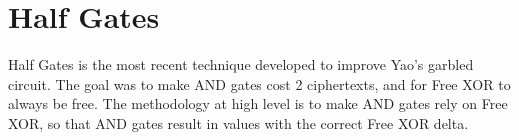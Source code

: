 \documentclass[12pt,twoside]{reedthesis}
\begin{document}

\section{Half Gates}
Half Gates is the most recent technique developed to improve Yao's garbled circuit.
The goal was to make AND gates cost 2 ciphertexts, and for Free XOR to always be free.
The methodology at high level is to make AND gates rely on Free XOR, so that AND gates result in values with the correct Free XOR delta.
\end{document}

